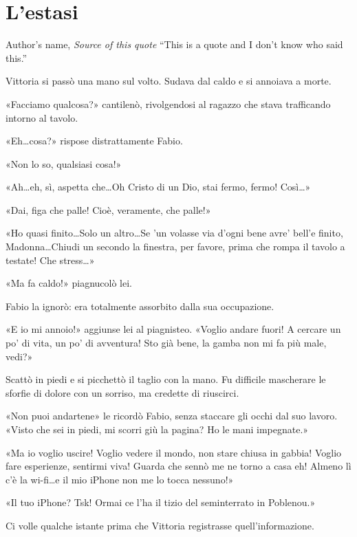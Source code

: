 \chapter{L'estasi}

\begin{chapquote}{Author's name, \textit{Source of this quote}}
``This is a quote and I don't know who said this.''
\end{chapquote}


Vittoria si passò una mano sul volto. Sudava dal caldo e si annoiava a morte.

«Facciamo qualcosa?» cantilenò, rivolgendosi al ragazzo che stava trafficando intorno al tavolo.

«Eh\ldots cosa?» rispose distrattamente Fabio.

«Non lo so, qualsiasi cosa!»

«Ah\ldots eh, sì, aspetta che\ldots Oh Cristo di un Dio, stai fermo, fermo! Così\ldots»

«Dai, figa che palle! Cioè, veramente, che palle!»

«Ho quasi finito\ldots Solo un altro\ldots Se 'un volasse via d'ogni bene avre' bell'e finito, Madonna\ldots Chiudi un secondo la finestra, per favore, prima che rompa il tavolo a testate! Che stress\ldots»

«Ma fa caldo!» piagnucolò lei.

Fabio la ignorò: era totalmente assorbito dalla sua occupazione.

«E io mi annoio!» aggiunse lei al piagnisteo. «Voglio andare fuori! A cercare un po' di vita, un po' di avventura! Sto già bene, la gamba non mi fa più male, vedi?»

Scattò in piedi e si picchettò il taglio con la mano. Fu difficile mascherare le sforfie di dolore con un sorriso, ma credette di riuscirci.

«Non puoi andartene» le ricordò Fabio, senza staccare gli occhi dal suo lavoro. «Visto che sei in piedi, mi scorri giù la pagina? Ho le mani impegnate.»

«Ma io voglio uscire! Voglio vedere il mondo, non stare chiusa in gabbia! Voglio fare esperienze, sentirmi viva! Guarda che sennò me ne torno a casa eh! Almeno lì c'è la wi-fi\ldots e il mio iPhone non me lo tocca nessuno!»

«Il tuo iPhone? Tsk! Ormai ce l'ha il tizio del seminterrato in Poblenou.»

Ci volle qualche istante prima che Vittoria registrasse quell'informazione.


